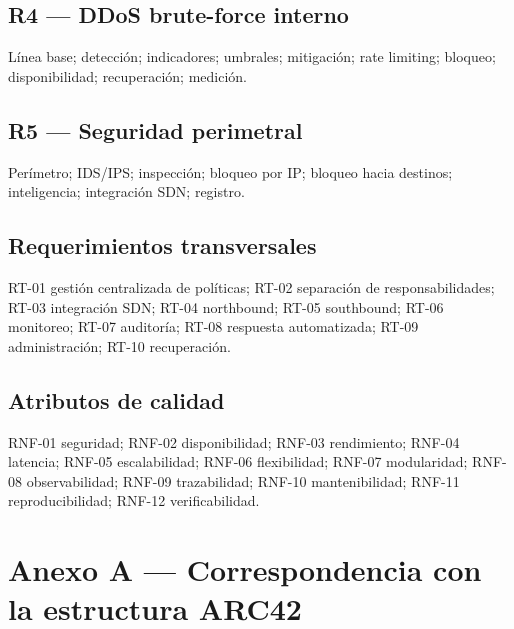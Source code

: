 \documentclass[11pt,a4paper]{article}
\begin{document}
\subsection{R4 --- DDoS brute-force interno}
Línea base; detección; indicadores; umbrales; mitigación; rate limiting; bloqueo; disponibilidad; recuperación; medición.

\subsection{R5 --- Seguridad perimetral}
Perímetro; IDS/IPS; inspección; bloqueo por IP; bloqueo hacia destinos; inteligencia; integración SDN; registro.

\subsection{Requerimientos transversales}
RT-01 gestión centralizada de políticas; RT-02 separación de responsabilidades; RT-03 integración SDN; RT-04 northbound; RT-05 southbound; RT-06 monitoreo; RT-07 auditoría; RT-08 respuesta automatizada; RT-09 administración; RT-10 recuperación.

\subsection{Atributos de calidad}
RNF-01 seguridad; RNF-02 disponibilidad; RNF-03 rendimiento; RNF-04 latencia; RNF-05 escalabilidad; RNF-06 flexibilidad; RNF-07 modularidad; RNF-08 observabilidad; RNF-09 trazabilidad; RNF-10 mantenibilidad; RNF-11 reproducibilidad; RNF-12 verificabilidad.

\appendix
\section{Anexo A --- Correspondencia con la estructura ARC42}
\end{document}
